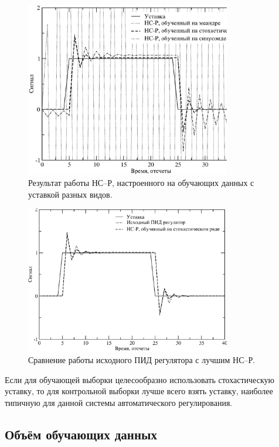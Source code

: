 \begin{figure}
\centering
\includegraphics[width=0.8\textwidth,%
  totalheight=0.35\textheight]{nnc_system_response_rus}
\caption{Результат работы НС--Р, настроенного на обучающих данных с уставкой
         разных видов.}\label{fig:nnc_system_response}
\end{figure}

\begin{figure}
\centering
\includegraphics[width=0.8\textwidth,%
  totalheight=0.35\textheight]{nnc_pid_system_responses_rus}
\caption{Сравнение работы исходного ПИД регулятора с лучшим НС--Р.}%
\label{fig:nnc_pid_system_responses}
\end{figure}

Если для обучающей выборки целесообразно использовать стохастическую
уставку, то для контрольной выборки лучше всего взять уставку,
наиболее типичную для данной системы автоматического регулирования.

\subsection{Объём обучающих данных}

